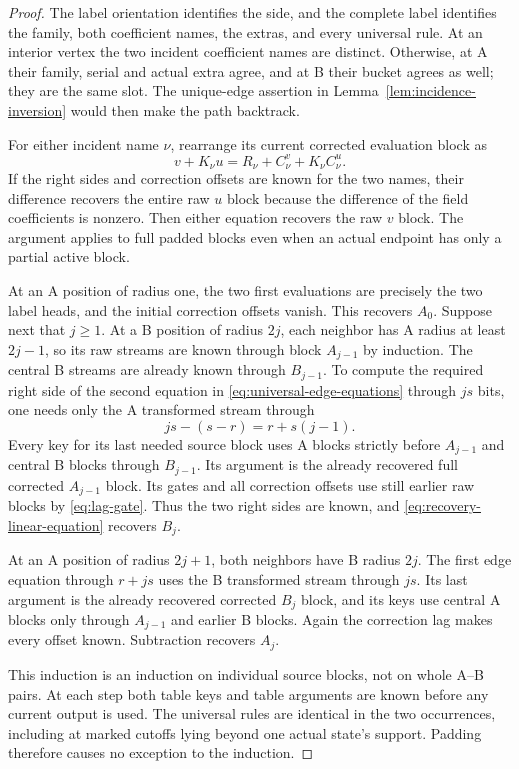 \begin{proof}
The label orientation identifies the side, and the complete label
identifies the family, both coefficient names, the extras, and every
universal rule.  At an interior vertex the two incident coefficient
names are distinct.  Otherwise, at A their family, serial and actual
extra agree, and at B their bucket agrees as well; they are the same
slot.  The unique-edge assertion in Lemma~\ref{lem:incidence-inversion}
would then make the path backtrack.

For either incident name $\nu$, rearrange its current corrected
evaluation block as
\begin{equation}\label{eq:recovery-linear-equation}
 v+K_\nu u=R_\nu+C^v_\nu+K_\nu C^u_\nu.
\end{equation}
If the right sides and correction offsets are known for the two names,
their difference recovers the entire raw $u$ block because the difference
of the field coefficients is nonzero.  Then either equation recovers
the raw $v$ block.  The argument applies to full padded blocks even
when an actual endpoint has only a partial active block.

At an A position of radius one, the two first evaluations are precisely
the two label heads, and the initial correction offsets vanish.  This
recovers $A_0$.  Suppose next that $j\ge1$.  At a B position of radius
$2j$, each neighbor has A radius at least $2j-1$, so its raw streams are
known through block $A_{j-1}$ by induction.  The central B streams are
already known through $B_{j-1}$.  To compute the required right side of
the second equation in \eqref{eq:universal-edge-equations} through $js$
bits, one needs only the A transformed stream through
\[
 js-(s-r)=r+s(j-1).
\]
Every key for its last needed source block uses A blocks strictly before
$A_{j-1}$ and central B blocks through $B_{j-1}$.  Its argument is the
already recovered full corrected $A_{j-1}$ block.  Its gates and all
correction offsets use still earlier raw blocks by
\eqref{eq:lag-gate}.  Thus the two right sides are known, and
\eqref{eq:recovery-linear-equation} recovers $B_j$.

At an A position of radius $2j+1$, both neighbors have B radius $2j$.
The first edge equation through $r+js$ uses the B transformed stream
through $js$.  Its last argument is the already recovered corrected
$B_j$ block, and its keys use central A blocks only through $A_{j-1}$
and earlier B blocks.  Again the correction lag makes every offset
known.  Subtraction recovers $A_j$.

This induction is an induction on individual source blocks, not on
whole A--B pairs.  At each step both table keys and table arguments
are known before any current output is used.  The universal rules
are identical in the two occurrences, including at marked cutoffs
lying beyond one actual state's support.  Padding therefore causes
no exception to the induction.
\end{proof}

